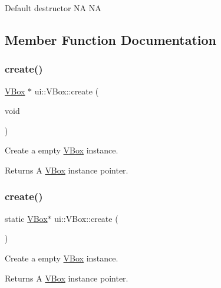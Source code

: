 Default destructor  NA  NA 

\subsection{Member Function Documentation}
\mbox{\label{classui_1_1VBox_a3709266293eca4d349ed2cb3a4f259dc}} 
\subsubsection{\texorpdfstring{create()}{create()}\hspace{0.1cm}{\footnotesize\ttfamily [1/4]}}
{\footnotesize\ttfamily \hyperlink{classui_1_1VBox}{V\+Box} $\ast$ ui\+::\+V\+Box\+::create (\begin{DoxyParamCaption}\item[{void}]{ }\end{DoxyParamCaption})\hspace{0.3cm}{\ttfamily [static]}}

Create a empty \hyperlink{classui_1_1VBox}{V\+Box} instance. \begin{DoxyReturn}{Returns}
A \hyperlink{classui_1_1VBox}{V\+Box} instance pointer. 
\end{DoxyReturn}
\mbox{\label{classui_1_1VBox_af93ba3a9a5937bcbb4d3fbe12881c80f}} 
\subsubsection{\texorpdfstring{create()}{create()}\hspace{0.1cm}{\footnotesize\ttfamily [2/4]}}
{\footnotesize\ttfamily static \hyperlink{classui_1_1VBox}{V\+Box}$\ast$ ui\+::\+V\+Box\+::create (\begin{DoxyParamCaption}{ }\end{DoxyParamCaption})\hspace{0.3cm}{\ttfamily [static]}}

Create a empty \hyperlink{classui_1_1VBox}{V\+Box} instance. \begin{DoxyReturn}{Returns}
A \hyperlink{classui_1_1VBox}{V\+Box} instance pointer. 
\end{DoxyReturn}
\mbox{\label{classui_1_1VBox_afa217961ff5274400794dac3c138b43e}} 
